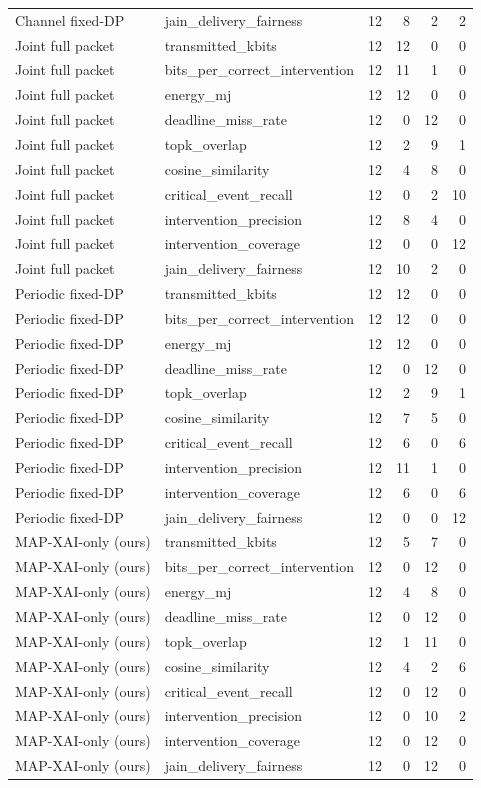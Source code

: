 \begin{longtable}{llrrrr}
Channel fixed-DP & jain\_delivery\_fairness & 12 & 8 & 2 & 2 \\
Joint full packet & transmitted\_kbits & 12 & 12 & 0 & 0 \\
Joint full packet & bits\_per\_correct\_intervention & 12 & 11 & 1 & 0 \\
Joint full packet & energy\_mj & 12 & 12 & 0 & 0 \\
Joint full packet & deadline\_miss\_rate & 12 & 0 & 12 & 0 \\
Joint full packet & topk\_overlap & 12 & 2 & 9 & 1 \\
Joint full packet & cosine\_similarity & 12 & 4 & 8 & 0 \\
Joint full packet & critical\_event\_recall & 12 & 0 & 2 & 10 \\
Joint full packet & intervention\_precision & 12 & 8 & 4 & 0 \\
Joint full packet & intervention\_coverage & 12 & 0 & 0 & 12 \\
Joint full packet & jain\_delivery\_fairness & 12 & 10 & 2 & 0 \\
Periodic fixed-DP & transmitted\_kbits & 12 & 12 & 0 & 0 \\
Periodic fixed-DP & bits\_per\_correct\_intervention & 12 & 12 & 0 & 0 \\
Periodic fixed-DP & energy\_mj & 12 & 12 & 0 & 0 \\
Periodic fixed-DP & deadline\_miss\_rate & 12 & 0 & 12 & 0 \\
Periodic fixed-DP & topk\_overlap & 12 & 2 & 9 & 1 \\
Periodic fixed-DP & cosine\_similarity & 12 & 7 & 5 & 0 \\
Periodic fixed-DP & critical\_event\_recall & 12 & 6 & 0 & 6 \\
Periodic fixed-DP & intervention\_precision & 12 & 11 & 1 & 0 \\
Periodic fixed-DP & intervention\_coverage & 12 & 6 & 0 & 6 \\
Periodic fixed-DP & jain\_delivery\_fairness & 12 & 0 & 0 & 12 \\
MAP-XAI-only (ours) & transmitted\_kbits & 12 & 5 & 7 & 0 \\
MAP-XAI-only (ours) & bits\_per\_correct\_intervention & 12 & 0 & 12 & 0 \\
MAP-XAI-only (ours) & energy\_mj & 12 & 4 & 8 & 0 \\
MAP-XAI-only (ours) & deadline\_miss\_rate & 12 & 0 & 12 & 0 \\
MAP-XAI-only (ours) & topk\_overlap & 12 & 1 & 11 & 0 \\
MAP-XAI-only (ours) & cosine\_similarity & 12 & 4 & 2 & 6 \\
MAP-XAI-only (ours) & critical\_event\_recall & 12 & 0 & 12 & 0 \\
MAP-XAI-only (ours) & intervention\_precision & 12 & 0 & 10 & 2 \\
MAP-XAI-only (ours) & intervention\_coverage & 12 & 0 & 12 & 0 \\
MAP-XAI-only (ours) & jain\_delivery\_fairness & 12 & 0 & 12 & 0 \\
\end{longtable}